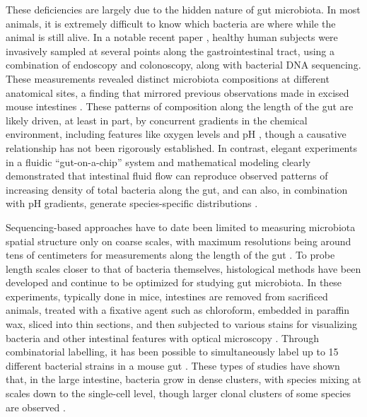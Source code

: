 These deficiencies are largely due to the hidden nature of gut microbiota. In most animals, it is extremely difficult to know which bacteria are where while the animal is still alive. In a notable recent paper \cite{zmora2018personalized}, healthy human subjects were invasively sampled at several points along the gastrointestinal tract, using a combination of endoscopy and colonoscopy, along with bacterial DNA sequencing. These measurements revealed distinct microbiota compositions at different anatomical sites, a finding that mirrored previous observations made in excised mouse intestines \cite{donaldson_gut_2015}. These patterns of composition along the length of the gut are likely driven, at least in part, by concurrent gradients in the chemical environment, including features like oxygen levels and pH \cite{donaldson_gut_2015}, though a causative relationship has not been rigorously established. In contrast, elegant experiments in a fluidic “gut-on-a-chip” system and mathematical modeling clearly demonstrated that intestinal fluid flow can reproduce observed patterns of increasing density of total bacteria along the gut, and can also, in combination with pH gradients, generate species-specific distributions \cite{cremer_effect_2016}.

Sequencing-based approaches have to date been limited to measuring microbiota spatial structure only on coarse scales, with maximum resolutions being around tens of centimeters for measurements along the length of the gut \cite{donaldson_gut_2015}. To probe length scales closer to that of bacteria themselves, histological methods have been developed and continue to be optimized for studying gut microbiota. In these experiments, typically done in mice, intestines are removed from sacrificed animals, treated with a fixative agent such as chloroform, embedded in paraffin wax, sliced into thin sections, and then subjected to various stains for visualizing bacteria and other intestinal features with optical microscopy \cite{tropini_gut_2017}. Through combinatorial labelling, it has been possible to simultaneously label up to 15 different bacterial strains in a mouse gut \cite{welch_spatial_2017}. These types of studies have shown that, in the large intestine, bacteria grow in dense clusters, with species mixing at scales down to the single-cell level, though larger clonal clusters of some species are observed \cite{welch_spatial_2017}. 

